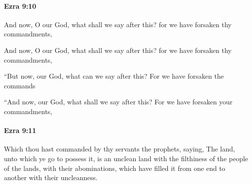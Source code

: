 		\paragraph{Ezra 9:10} %
			\label{EZRA-9-10}

			And now, O our God, what shall we say after this? for we have forsaken thy commandments,

			\begin{versebox}
					\item[BHS] 
					\item[LXX] 
					\item[ASV] And now, O our God, what shall we say after this? for we have forsaken thy commandments,
					\item[NIV] “But now, our God, what can we say after this? For we have forsaken the commands
					\item[NRSV] “And now, our God, what shall we say after this? For we have forsaken your commandments,
			\end{versebox}

		\paragraph{Ezra 9:11} %
			\label{EZRA-9-11}

			Which thou hast commanded by thy servants the prophets, saying, The land, unto which ye go to possess it, is an unclean land with the filthiness of the people of the lands, with their abominations, which have filled it from one end to another with their uncleanness.

